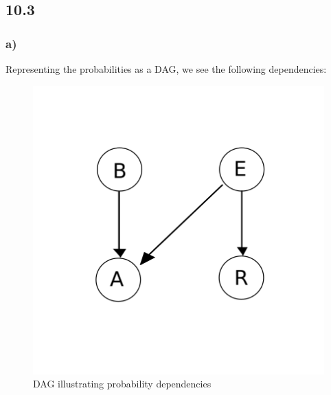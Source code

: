 \documentclass[11pt,a4paper]{article}
\begin{document}
  
\subsection*{10.3}
\subsubsection*{a)}
Representing the probabilities as a DAG, we see the following dependencies:
\begin{figure}[h]
  \centering
  \includegraphics[width=.4\textwidth]{graph}
    \caption{DAG illustrating probability dependencies}
  \end{figure}
\end{document}
